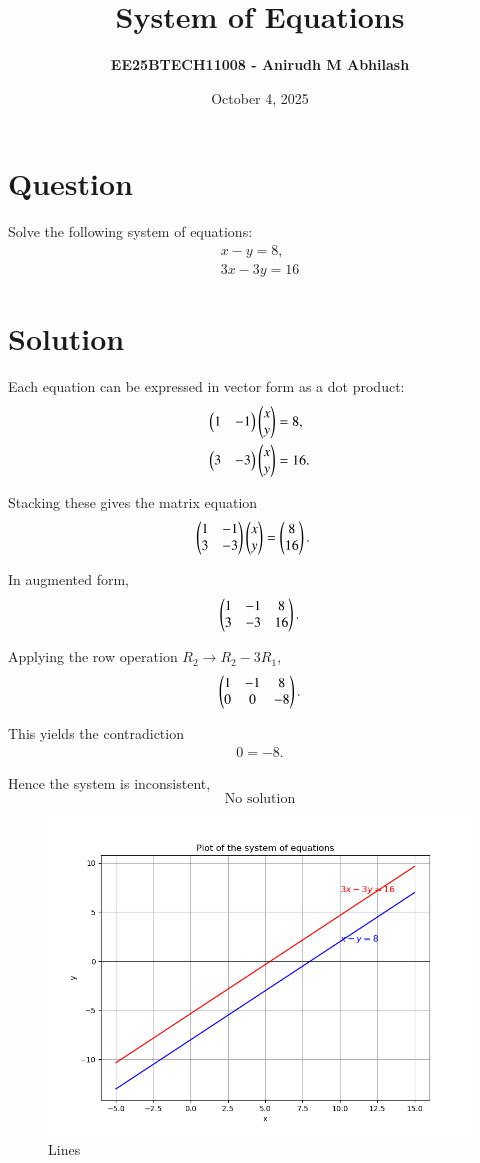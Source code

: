 \documentclass[12pt]{article}
\title{\textbf{System of Equations}}
\author{\textbf{EE25BTECH11008 - Anirudh M Abhilash}}
\date{October 4, 2025}
\begin{document}
\maketitle

\section*{Question}

Solve the following system of equations:
\begin{align*}
x - y = 8, \\ 3x - 3y = 16
\end{align*}

\section*{Solution}

Each equation can be expressed in vector form as a dot product:
\begin{align}
\begin{pmatrix}1 & -1\end{pmatrix}\begin{pmatrix}x \\ y\end{pmatrix} &= 8, \\
\begin{pmatrix}3 & -3\end{pmatrix}\begin{pmatrix}x \\ y\end{pmatrix} &= 16.
\end{align}

Stacking these gives the matrix equation
\begin{align}
\begin{pmatrix}1 & -1 \\ 3 & -3\end{pmatrix}\begin{pmatrix}x \\ y\end{pmatrix} &= \begin{pmatrix}8 \\ 16\end{pmatrix}.
\end{align}

In augmented form,
\begin{align}
\begin{pmatrix}1 & -1 & 8 \\ 3 & -3 & 16\end{pmatrix}.
\end{align}

Applying the row operation $R_2 \to R_2 - 3R_1$,
\begin{align}
\begin{pmatrix}1 & -1 & 8 \\ 0 & 0 & -8\end{pmatrix}.
\end{align}

This yields the contradiction
\begin{align}
0 = -8.
\end{align}

Hence the system is inconsistent,
\[
\boxed{\text{No solution}}
\]

\begin{figure}[H]\centering
\includegraphics[width=1\columnwidth]{figs/plt.png}
\caption{Lines}
\label{fig:plt}
\end{figure}
\end{document}
